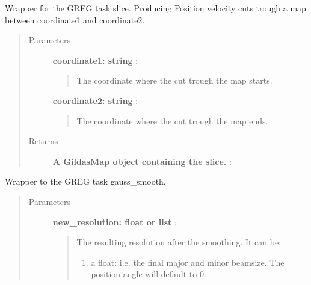 \documentclass[a4paper,10pt,english]{sphinxmanual}
\begin{document}
\begin{fulllineitems}
\begin{fulllineitems}
\end{fulllineitems}


\begin{fulllineitems}
\label{maps:astrolyze.maps.gildas.GildasMap.slice}
Wrapper for the GREG task slice. Producing Position velocity cuts
trough a map between coordinate1 and coordinate2.
\begin{quote}\begin{description}
\item[{Parameters }] \leavevmode
\textbf{coordinate1: string} :
\begin{quote}

The coordinate where the cut trough the map starts.
\end{quote}

\textbf{coordinate2: string} :
\begin{quote}

The coordinate where the cut trough the map ends.
\end{quote}

\item[{Returns }] \leavevmode
\textbf{A GildasMap object containing the slice.} :

\end{description}\end{quote}

\end{fulllineitems}


\begin{fulllineitems}
\label{maps:astrolyze.maps.gildas.GildasMap.smooth}
Wrapper to the GREG task gauss\_smooth.
\begin{quote}\begin{description}
\item[{Parameters }] \leavevmode
\textbf{new\_resolution: float or list} :
\begin{quote}

The resulting resolution after the smoothing.
It can be:
\begin{enumerate}
\item {} 
a float: i.e. the final major and minor beamsize.
The position angle will default to 0.


\end{enumerate}
\end{quote}
\end{description}
\end{quote}
\end{fulllineitems}
\end{fulllineitems}
\end{document}
